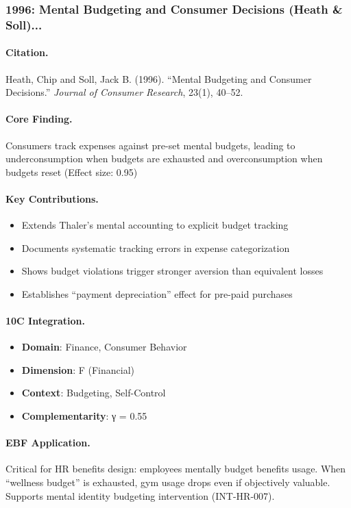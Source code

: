 \subsubsection{1996: Mental Budgeting and Consumer Decisions (Heath \& Soll)...}

\paragraph{Citation.}
Heath, Chip and Soll, Jack B. (1996). ``Mental Budgeting and Consumer Decisions.''
\textit{Journal of Consumer Research}, 23(1), 40--52.

\paragraph{Core Finding.}
Consumers track expenses against pre-set mental budgets, leading to underconsumption when budgets are exhausted and overconsumption when budgets reset (Effect size: 0.95)

\paragraph{Key Contributions.}
\begin{itemize}[nosep]
  \item Extends Thaler's mental accounting to explicit budget tracking
  \item Documents systematic tracking errors in expense categorization
  \item Shows budget violations trigger stronger aversion than equivalent losses
  \item Establishes ``payment depreciation'' effect for pre-paid purchases
\end{itemize}

\paragraph{10C Integration.}
\begin{itemize}[nosep]
  \item \textbf{Domain}: Finance, Consumer Behavior
  \item \textbf{Dimension}: F (Financial)
  \item \textbf{Context}: Budgeting, Self-Control
  \item \textbf{Complementarity}: γ = 0.55
\end{itemize}

\paragraph{EBF Application.}
Critical for HR benefits design: employees mentally budget benefits usage. When ``wellness budget'' is exhausted, gym usage drops even if objectively valuable. Supports mental identity budgeting intervention (INT-HR-007).

